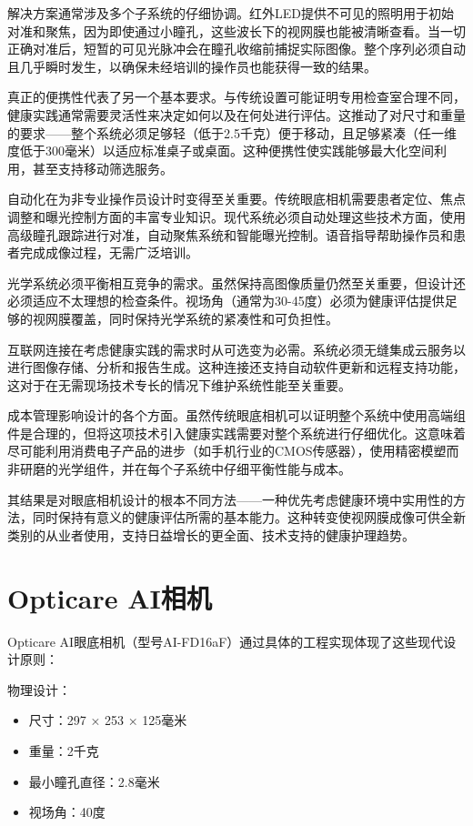 \documentclass[
  Letterpaper,
]{scrbook}
\providecommand{\tightlist}{%
  \setlength{\itemsep}{0pt}\setlength{\parskip}{0pt}}\usepackage{longtable,booktabs,array}
\begin{document}
解决方案通常涉及多个子系统的仔细协调。红外LED提供不可见的照明用于初始对准和聚焦，因为即使通过小瞳孔，这些波长下的视网膜也能被清晰查看。当一切正确对准后，短暂的可见光脉冲会在瞳孔收缩前捕捉实际图像。整个序列必须自动且几乎瞬时发生，以确保未经培训的操作员也能获得一致的结果。

真正的便携性代表了另一个基本要求。与传统设置可能证明专用检查室合理不同，健康实践通常需要灵活性来决定如何以及在何处进行评估。这推动了对尺寸和重量的要求------整个系统必须足够轻（低于2.5千克）便于移动，且足够紧凑（任一维度低于300毫米）以适应标准桌子或桌面。这种便携性使实践能够最大化空间利用，甚至支持移动筛选服务。

自动化在为非专业操作员设计时变得至关重要。传统眼底相机需要患者定位、焦点调整和曝光控制方面的丰富专业知识。现代系统必须自动处理这些技术方面，使用高级瞳孔跟踪进行对准，自动聚焦系统和智能曝光控制。语音指导帮助操作员和患者完成成像过程，无需广泛培训。

光学系统必须平衡相互竞争的需求。虽然保持高图像质量仍然至关重要，但设计还必须适应不太理想的检查条件。视场角（通常为30-45度）必须为健康评估提供足够的视网膜覆盖，同时保持光学系统的紧凑性和可负担性。

互联网连接在考虑健康实践的需求时从可选变为必需。系统必须无缝集成云服务以进行图像存储、分析和报告生成。这种连接还支持自动软件更新和远程支持功能，这对于在无需现场技术专长的情况下维护系统性能至关重要。

成本管理影响设计的各个方面。虽然传统眼底相机可以证明整个系统中使用高端组件是合理的，但将这项技术引入健康实践需要对整个系统进行仔细优化。这意味着尽可能利用消费电子产品的进步（如手机行业的CMOS传感器），使用精密模塑而非研磨的光学组件，并在每个子系统中仔细平衡性能与成本。

其结果是对眼底相机设计的根本不同方法------一种优先考虑健康环境中实用性的方法，同时保持有意义的健康评估所需的基本能力。这种转变使视网膜成像可供全新类别的从业者使用，支持日益增长的更全面、技术支持的健康护理趋势。

\section{Opticare AI相机}\label{opticare-aiux76f8ux673a}

Opticare
AI眼底相机（型号AI-FD16aF）通过具体的工程实现体现了这些现代设计原则：

物理设计：

\begin{itemize}
\tightlist
\item
  尺寸：297 × 253 × 125毫米
\item
  重量：2千克
\item
  最小瞳孔直径：2.8毫米
\item
  视场角：40度
\end{itemize}
\end{document}
